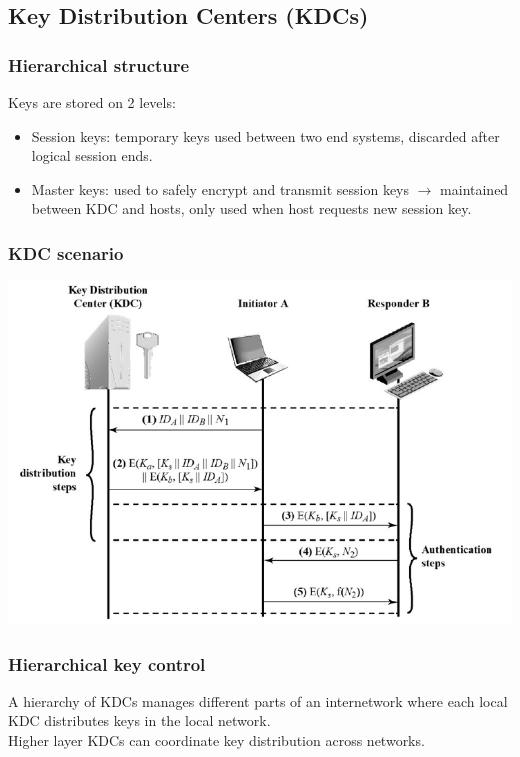 \documentclass[12pt]{article}
\begin{document}
 \subsection{Key Distribution Centers (KDCs)}
 \noindent{}

 \subsubsection{Hierarchical structure}
 Keys are stored on 2 levels:
 \begin{itemize}
 	\item Session keys: temporary keys used between two end systems, discarded after logical session ends.
 	\item Master keys: used to safely encrypt and transmit session keys $\rightarrow$ maintained between KDC and hosts, only used when host requests new session key.
 \end{itemize}

 \subsubsection{KDC scenario}
 \includegraphics[width=\linewidth]{./slides/L5P2KDC.PNG}
 
 \subsubsection{Hierarchical key control}
 A hierarchy of KDCs manages different parts of an internetwork where each local KDC distributes keys in the local network.\\
 Higher layer KDCs can coordinate key distribution across networks.
 
\end{document}
